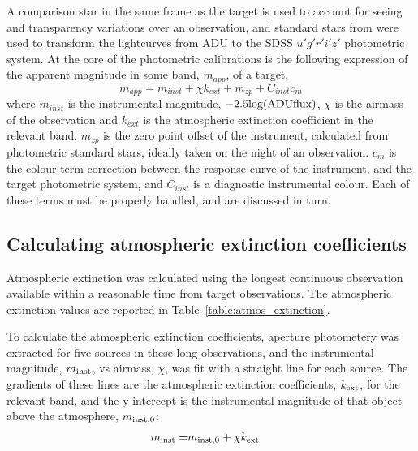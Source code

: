 A comparison star in the same frame as the target is used to account for seeing and transparency variations over an observation, and standard stars from \citet{smith2002} were used to transform the lightcurves from ADU to the SDSS $u'g'r'i'z'$ photometric system. At the core of the photometric calibrations is the following expression of the apparent magnitude in some band, $m_{app}$, of a target,
\begin{equation}
    \label{eqn:observations:instrumental magnitude from scratch}
    m_{app} = m_{inst} + \chi k_{ext} + m_{zp} + C_{inst}c_{m}
\end{equation}
where $m_{inst}$ is the instrumental magnitude, $-2.5 \rm log(ADU flux)$, $\chi$ is the airmass of the observation and $k_{ext}$ is the atmospheric extinction coefficient in the relevant band. $m_{zp}$ is the zero point offset of the instrument, calculated from photometric standard stars, ideally taken on the night of an observation. $c_{m}$ is the colour term correction between the response curve of the instrument, and the target photometric system, and $C_{inst}$ is a diagnostic instrumental colour. Each of these terms must be properly handled, and are discussed in turn. 


\subsection{Calculating atmospheric extinction coefficients}
\label{sect:calcualting atmospheric extinction}

Atmospheric extinction was calculated using the longest continuous observation available within a reasonable time from target observations.
The atmospheric extinction values are reported in Table~\ref{table:atmos_extinction}.

To calculate the atmospheric extinction coefficients, aperture photometery was extracted for five sources in these long observations, and the instrumental magnitude, $m_{\rm inst}$, vs airmass, $\chi$, was fit with a straight line for each source. 
The gradients of these lines are the atmospheric extinction coefficients, $k_{\rm ext}$, for the relevant band, and the y-intercept is the instrumental magnitude of that object above the atmosphere, $m_{\rm inst,0}$:
\begin{align*}
    m_{\rm inst} =& m_{\rm inst,0} + \chi k_{\rm ext} 
\end{align*}

